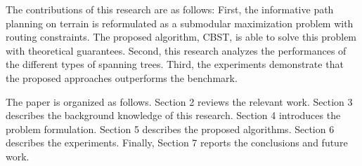 
The contributions of this research are as follows:
First, the informative path planning on terrain is reformulated as a submodular maximization problem with routing constraints.
The proposed algorithm, CBST, is able to solve this problem with theoretical guarantees.
Second, this research analyzes the performances of the different types of spanning trees.
Third, the experiments demonstrate that the proposed approaches outperforms the benchmark.

The paper is organized as follows. Section 2 reviews the relevant work. Section 3 describes the background knowledge of this research. Section 4 introduces the problem formulation. Section 5 describes the proposed algorithms. Section 6 describes the experiments. Finally, Section 7 reports the conclusions and future work. 